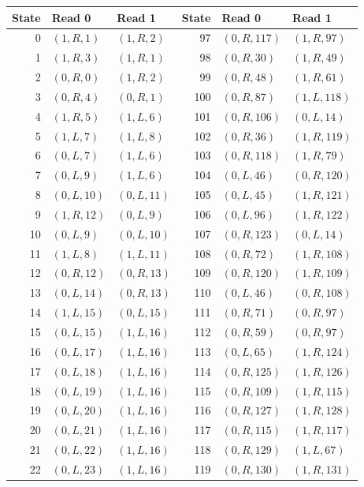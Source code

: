 \begingroup
\small
\setlength{\LTleft}{0pt}
\setlength{\LTright}{\fill}
\begin{longtable}{rll@{\qquad\qquad}rll}
\toprule
State & Read 0 & Read 1 & State & Read 0 & Read 1\\
\midrule\endhead
0 & $(1,R,1)$ & $(1,R,2)$ & 97 & $(0,R,117)$ & $(1,R,97)$\\
1 & $(1,R,3)$ & $(1,R,1)$ & 98 & $(0,R,30)$ & $(1,R,49)$\\
2 & $(0,R,0)$ & $(1,R,2)$ & 99 & $(0,R,48)$ & $(1,R,61)$\\
3 & $(0,R,4)$ & $(0,R,1)$ & 100 & $(0,R,87)$ & $(1,L,118)$\\
4 & $(1,R,5)$ & $(1,L,6)$ & 101 & $(0,R,106)$ & $(0,L,14)$\\
5 & $(1,L,7)$ & $(1,L,8)$ & 102 & $(0,R,36)$ & $(1,R,119)$\\
6 & $(0,L,7)$ & $(1,L,6)$ & 103 & $(0,R,118)$ & $(1,R,79)$\\
7 & $(0,L,9)$ & $(1,L,6)$ & 104 & $(0,L,46)$ & $(0,R,120)$\\
8 & $(0,L,10)$ & $(0,L,11)$ & 105 & $(0,L,45)$ & $(1,R,121)$\\
9 & $(1,R,12)$ & $(0,L,9)$ & 106 & $(0,L,96)$ & $(1,R,122)$\\
10 & $(0,L,9)$ & $(0,L,10)$ & 107 & $(0,R,123)$ & $(0,L,14)$\\
11 & $(1,L,8)$ & $(1,L,11)$ & 108 & $(0,R,72)$ & $(1,R,108)$\\
12 & $(0,R,12)$ & $(0,R,13)$ & 109 & $(0,R,120)$ & $(1,R,109)$\\
13 & $(0,L,14)$ & $(0,R,13)$ & 110 & $(0,L,46)$ & $(0,R,108)$\\
14 & $(1,L,15)$ & $(0,L,15)$ & 111 & $(0,R,71)$ & $(0,R,97)$\\
15 & $(0,L,15)$ & $(1,L,16)$ & 112 & $(0,R,59)$ & $(0,R,97)$\\
16 & $(0,L,17)$ & $(1,L,16)$ & 113 & $(0,L,65)$ & $(1,R,124)$\\
17 & $(0,L,18)$ & $(1,L,16)$ & 114 & $(0,R,125)$ & $(1,R,126)$\\
18 & $(0,L,19)$ & $(1,L,16)$ & 115 & $(0,R,109)$ & $(1,R,115)$\\
19 & $(0,L,20)$ & $(1,L,16)$ & 116 & $(0,R,127)$ & $(1,R,128)$\\
20 & $(0,L,21)$ & $(1,L,16)$ & 117 & $(0,R,115)$ & $(1,R,117)$\\
21 & $(0,L,22)$ & $(1,L,16)$ & 118 & $(0,R,129)$ & $(1,L,67)$\\
22 & $(0,L,23)$ & $(1,L,16)$ & 119 & $(0,R,130)$ & $(1,R,131)$\\

\end{longtable}
